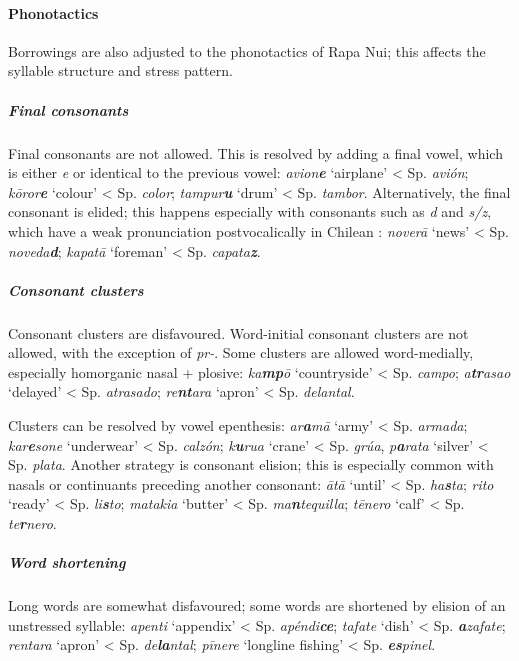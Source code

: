 \paragraph{Phonotactics} Borrowings are also adjusted to the phonotactics of Rapa Nui; this affects the syllable structure and stress pattern. 

\subparagraph{Final consonants} Final consonants are not allowed. This is resolved by adding a final vowel, which is either \textit{e} or identical to the previous vowel: \textit{{\ꞌ}avion\textbf{e}} ‘airplane’ {\textless} Sp. \textit{avión}; \textit{kōror\textbf{e}} ‘colour’ {\textless} Sp. \textit{color}; \textit{tampur\textbf{u}} ‘drum’ {\textless} Sp. \textit{tambor}. Alternatively, the final consonant is elided; this happens especially with consonants such as \textit{d} and \textit{s/z}, which have a weak pronunciation postvocalically in Chilean : \textit{noverā} ‘news’ {\textless} Sp. \textit{noveda\textbf{d}}; \textit{kapatā} ‘foreman’ {\textless} Sp. \textit{capata\textbf{z}}.

\subparagraph{Consonant clusters} Consonant clusters are disfavoured. Word-initial consonant clusters are not allowed, with the exception of \textit{pr-}. Some clusters are allowed word-medially, especially homorganic nasal + plosive: \textit{ka\textbf{mp}ō} ‘countryside’ {\textless} Sp. \textit{campo}; \textit{a\textbf{tr}asao} ‘delayed’ {\textless} Sp. \textit{atrasado}; \textit{re\textbf{nt}ara} ‘apron’ {\textless} Sp. \textit{delantal}.

Clusters can be resolved by vowel epenthesis: \textit{{\ꞌ}ar\textbf{a}mā} ‘army’ {\textless} Sp. \textit{armada}; \textit{kar\textbf{e}sone} ‘underwear’ {\textless} Sp. \textit{calzón}; \textit{k\textbf{u}rua} ‘crane’ {\textless} Sp. \textit{grúa}, \textit{p\textbf{a}rata} ‘silver’ {\textless} Sp. \textit{plata}. Another strategy is consonant elision; this is especially common with nasals or continuants preceding another consonant: \textit{{\ꞌ}ātā} ‘until’ {\textless} Sp. \textit{ha\textbf{s}ta}; \textit{rito} ‘ready’ {\textless} Sp. \textit{li\textbf{s}to}; \textit{matakia} ‘butter’ {\textless} Sp. \textit{ma\textbf{n}tequilla}; \textit{tēnero} ‘calf’ {\textless} Sp. \textit{te\textbf{r}nero}.

\subparagraph{Word shortening} Long words are somewhat disfavoured; some words are shortened by elision of an unstressed syllable: \textit{apenti} ‘appendix’ {\textless} Sp. \textit{apéndi\textbf{ce}}; \textit{tafate} ‘dish’ {\textless} Sp. \textit{\textbf{a}zafate}; \textit{rentara} ‘apron’ {\textless} Sp. \textit{de\textbf{la}ntal}; \textit{pīnere} ‘longline fishing’ {\textless} Sp. \textit{\textbf{es}pinel}.


